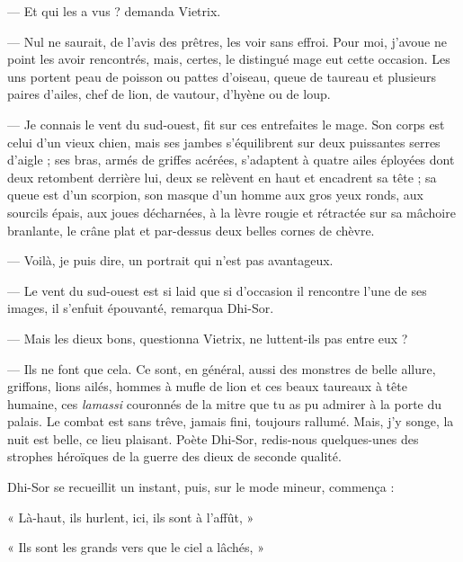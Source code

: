 \documentclass[a4paper, 11pt, oneside, polutonikogreek, french]{article}
\begin{document}
--- Et qui les a vus ? demanda Vietrix.

--- Nul ne saurait, de l'avis des prêtres, les voir sans effroi. Pour moi, j'avoue ne point les avoir rencontrés, mais, certes, le distingué mage eut cette occasion. Les uns portent peau de poisson ou pattes d'oiseau, queue de taureau et plusieurs paires d'ailes, chef de lion, de vautour, d'hyène ou de loup.

\bigskip
\centerline{\EightStarTaper}
\centerline{\EightStarTaper\EightStarTaper}
\bigskip

--- Je connais le vent du sud-ouest, fit sur ces entrefaites le mage. Son corps est celui d'un vieux chien, mais ses jambes s'équilibrent sur deux puissantes serres d'aigle ; ses bras, armés de griffes acérées, s'adaptent à quatre ailes éployées dont deux retombent derrière lui, deux se relèvent en haut et encadrent sa tête ; sa queue est d'un scorpion, son masque d'un homme aux gros yeux ronds, aux sourcils épais, aux joues décharnées, à la lèvre rougie et rétractée sur sa mâchoire branlante, le crâne plat et par-dessus deux belles cornes de chèvre.

--- Voilà, je puis dire, un portrait qui n'est pas avantageux.

--- Le vent du sud-ouest est si laid que si d'occasion il rencontre l'une de ses images, il s'enfuit épouvanté, remarqua Dhi-Sor.

\bigskip
\centerline{\EightStarTaper}
\centerline{\EightStarTaper\EightStarTaper}
\bigskip

--- Mais les dieux bons, questionna Vietrix, ne luttent-ils pas entre eux ?

--- Ils ne font que cela. Ce sont, en général, aussi des monstres de belle allure, griffons, lions ailés, hommes à mufle de lion et ces beaux taureaux à tête humaine, ces \emph{lamassi} couronnés de la mitre que tu as pu admirer à la porte du palais. Le combat est sans trêve, jamais fini, toujours rallumé. Mais, j'y songe, la nuit est belle, ce lieu plaisant. Poète Dhi-Sor, redis-nous quelques-unes des strophes héroïques de la guerre des dieux de seconde qualité.

\bigskip
\centerline{\EightStarTaper}
\centerline{\EightStarTaper\EightStarTaper}
\bigskip

Dhi-Sor se recueillit un instant, puis, sur le mode mineur, commença :

« Là-haut, ils hurlent, ici, ils sont à l'affût, »

« Ils sont les grands vers que le ciel a lâchés, »
\end{document}

